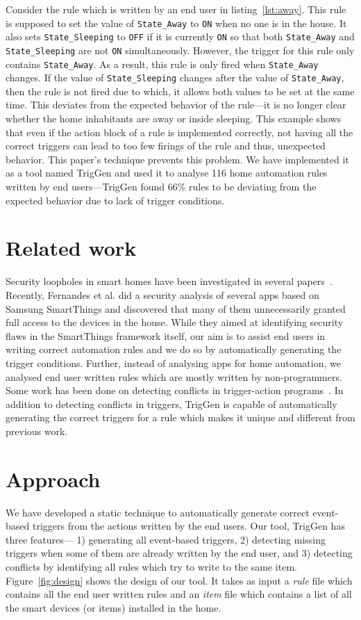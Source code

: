 \documentclass{sig-alternate-05-2015}
\begin{document}
Consider the rule which is written by an end user in listing~\ref{lst:away}. This rule is supposed to set the value of \texttt{State\_Away} to \texttt{ON} when no one is in the house. It also sets \texttt{State\_Sleeping} to \texttt{OFF} if it is currently \texttt{ON} so that both \texttt{State\_Away} and \texttt{State\_Sleeping} are not \texttt{ON} simultaneously. However, the trigger for this rule only contains \texttt{State\_Away}. As a result, this rule is only fired when \texttt{State\_Away} changes. If the value of \texttt{State\_Sleeping} changes after the value of \texttt{State\_Away}, then the rule is not fired due to which, it allows both values to be set at the same time. This deviates from the expected behavior of the rule---it is no longer clear whether the home inhabitants are away or inside sleeping. This example shows that even if the action block of a rule is implemented correctly, not having all the correct triggers can lead to too few firings of the rule and thus, unexpected behavior. This paper's technique prevents this problem. We have implemented it as a tool named TrigGen and used it to analyse 116 home automation rules written by end users---TrigGen found 66\% rules to be deviating from the expected behavior due to lack of trigger conditions.

\section{Related work}
Security loopholes in smart homes have been investigated in several papers~\cite{yoshi, dhanjani, jung, todayToTomorrow}. Recently, Fernandes et al.\cite{smartthings16} did a  security analysis of several apps based on Samsung SmartThings and discovered that many of them unnecessarily granted full access to the devices in the house. While they aimed at identifying security flaws in the SmartThings framework itself, our aim is to assist end users in writing correct automation rules and we do so by automatically generating the trigger conditions.  Further, instead of analysing apps for home automation, we analysed end user written rules which are mostly written by non-programmers. Some work has been done on detecting conflicts in trigger-action programs~\cite{rvs, homer, utea}. In addition to detecting conflicts in triggers, TrigGen is capable of automatically generating the correct triggers for a rule which makes it unique and different from previous work.

\section{Approach}
We have developed a static technique to automatically generate correct event-based triggers from the actions written by the end users. Our tool, TrigGen has three features--- 1) generating all event-based triggers, 2) detecting missing triggers when some of them are already written by the end user, and 3) detecting conflicts by identifying all rules which try to write to the same item. 
Figure~\ref{fig:design} shows the design of our tool. It takes as input a \textit{rule} file which contains all the end user written rules and an \textit{item} file which contains a list of all the smart devices (or items) installed in the home. 
\end{document}
